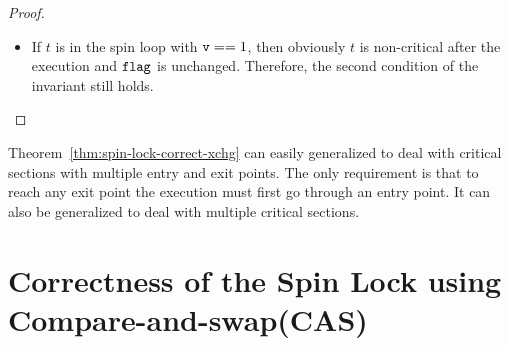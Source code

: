 \documentclass{article}[10pt]
\begin{document}
\begin{proof}
\begin{itemize}
\begin{itemize}
\begin{itemize}
      \end{itemize}

      \item If $t$ is in the spin loop with $\text{\ttfamily v} == 1$, then obviously
        $t$ is non-critical after the execution and $\text{\ttfamily flag}$ is
        unchanged. Therefore, the second condition of the invariant
        still holds.
    \end{itemize}
  \end{itemize}
\end{proof}

Theorem~\ref{thm:spin-lock-correct-xchg} can easily generalized to deal
with critical sections with multiple entry and exit points. The only
requirement is that to reach any exit point the execution must first
go through an entry point. It can also be generalized to deal with
multiple critical sections.


\section{Correctness of the Spin Lock using Compare-and-swap(CAS)}
\label{sec:spin-lock-cas}
\end{document}
